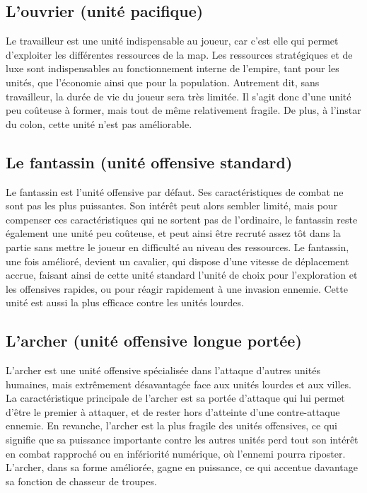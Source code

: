 \documentclass[12pt]{report}
\begin{document}
\subsection{L'ouvrier (unité pacifique)}

Le travailleur est une unité indispensable au joueur, car c’est elle qui permet
d’exploiter les différentes ressources de la map. Les ressources stratégiques et
de luxe sont indispensables au fonctionnement interne de l’empire, tant pour les
unités, que l'économie ainsi que pour la population. Autrement dit, sans
travailleur, la durée de vie du joueur sera très limitée. Il s’agit donc d’une
unité peu coûteuse à former, mais tout de même relativement fragile. De plus, à
l’instar du colon, cette unité n’est pas améliorable.

\subsection{Le fantassin (unité offensive standard)}

Le fantassin est l’unité offensive par défaut. Ses caractéristiques de combat ne
sont pas les plus puissantes. Son intérêt peut alors sembler limité, mais pour
compenser ces caractéristiques qui ne sortent pas de l’ordinaire, le fantassin
reste également une unité peu coûteuse, et peut ainsi être recruté assez tôt
dans la partie sans mettre le joueur en difficulté au niveau des ressources. Le
fantassin, une fois amélioré, devient un cavalier, qui dispose d’une vitesse de
déplacement accrue, faisant ainsi de cette unité standard l’unité de choix
pour l’exploration et les offensives rapides, ou pour réagir rapidement à une
invasion ennemie. Cette unité est aussi la plus efficace contre les unités
lourdes.

\subsection{L'archer (unité offensive longue portée)}

L’archer est une unité offensive spécialisée dans l’attaque d’autres unités
humaines, mais extrêmement désavantagée face aux unités lourdes et aux villes.
La caractéristique principale de l’archer est sa portée d’attaque qui lui permet
d’être le premier à attaquer, et de rester hors d’atteinte d’une contre-attaque
ennemie. En revanche, l’archer est la plus fragile des unités offensives, ce qui
signifie que sa puissance importante contre les autres unités perd tout son
intérêt en combat rapproché ou en infériorité numérique, où l’ennemi pourra
riposter. L’archer, dans sa forme améliorée, gagne en puissance, ce qui accentue
davantage sa fonction de chasseur de troupes.
\end{document}
